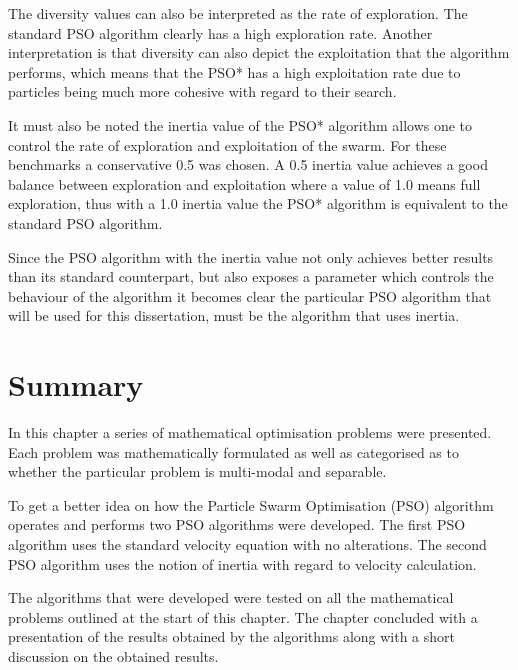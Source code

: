 The diversity values can also be interpreted as the rate of exploration. The standard PSO algorithm clearly has a high exploration rate. Another interpretation is that diversity can also depict the exploitation that the algorithm performs, which means that the PSO* has a high exploitation rate due to particles being much more cohesive with regard to their search.

It must also be noted the inertia value of the PSO* algorithm allows one to control the rate of exploration and exploitation of the swarm. For these benchmarks a conservative 0.5 was chosen. A 0.5 inertia value achieves a good balance between exploration and exploitation where a value of 1.0 means full exploration, thus with a 1.0 inertia value the PSO* algorithm is equivalent to the standard PSO algorithm.

Since the PSO algorithm with the inertia value not only achieves better results than its standard counterpart, but also exposes a parameter which controls the behaviour of the algorithm it becomes clear the particular PSO algorithm that will be used for this dissertation, must be the algorithm that uses inertia.
\section{Summary}
In this chapter a series of mathematical optimisation problems were presented. Each problem was mathematically formulated as well as categorised as to whether the particular problem is multi-modal and separable.

To get a better idea on how the Particle Swarm Optimisation (PSO) algorithm operates and performs two PSO algorithms were developed. The first PSO algorithm uses the standard velocity equation with no alterations. The second PSO algorithm uses the notion of inertia with regard to velocity calculation.

The algorithms that were developed were tested on all the mathematical problems outlined at the start of this chapter. The chapter concluded with a presentation of the results obtained by the algorithms along with a short discussion on the obtained results.
